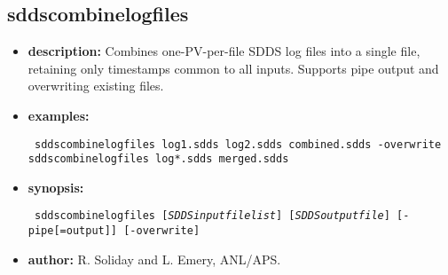 %
\newpage
\subsection{sddscombinelogfiles}
\label{sddscombinelogfiles}

\begin{itemize}
\item {\bf description:} Combines one-PV-per-file SDDS log files into a single file, retaining only timestamps common to all inputs. Supports pipe output and overwriting existing files.
\item {\bf examples:}
\begin{flushleft}{\tt
sddscombinelogfiles log1.sdds log2.sdds combined.sdds -overwrite\\
sddscombinelogfiles log*.sdds merged.sdds
}\end{flushleft}
\item {\bf synopsis:}
\begin{flushleft}{\tt
sddscombinelogfiles [{\em SDDSinputfilelist}] [{\em SDDSoutputfile}] [-pipe[=output]] [-overwrite]
}\end{flushleft}
\item {\bf author:} R. Soliday and L. Emery, ANL/APS.
\end{itemize}

